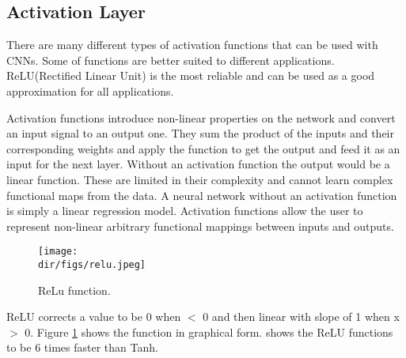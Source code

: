 \subsection{Activation Layer}
There are many different types of activation functions that can be used with CNNs. Some of functions are better suited to different applications. ReLU(Rectified Linear Unit) is the most reliable and can be used as a good approximation for all applications. \par
Activation functions introduce non-linear properties on the network and convert an input signal to an output one. They sum the product of the inputs and their corresponding weights and apply the function to get the output and feed it as an input for the next layer. Without an activation function the output would be a linear function. These are limited in their complexity and cannot learn complex functional maps from the data. A neural network without an activation function is simply a linear regression model. Activation functions allow the user to represent non-linear arbitrary functional mappings between inputs and outputs. \par
\begin{figure}[H]
    \centering
    \texttt{[image: \\dir/figs/relu.jpeg]}
    \caption{ReLu function.}
    \label{fig.relu}
\end{figure}
ReLU corrects a value to be 0 when $<$ 0 and then linear with slope of 1 when x $>$ 0. Figure \ref{fig.relu} shows the function in graphical form. \citet{krizhevsky17} shows the ReLU functions to be 6 times faster than Tanh. 
